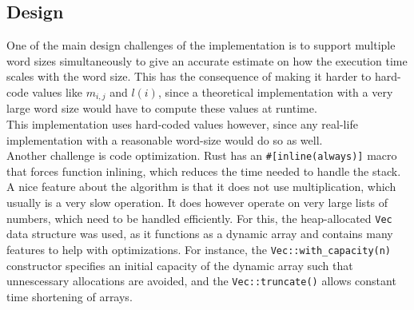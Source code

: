 \subsection{Design}
One of the main design challenges of the implementation is to support multiple word sizes simultaneously to give an accurate estimate on how the execution time scales with the word size. This has the consequence of making it harder to hard-code values like $m_{i, j}$ and $l(i)$, since a theoretical implementation with a very large word size would have to compute these values at runtime.\\
This implementation uses hard-coded values however, since any real-life implementation with a reasonable word-size would do so as well.\\
Another challenge is code optimization. Rust has an \texttt{\#[inline(always)]} macro that forces function inlining, which reduces the time needed to handle the stack.
A nice feature about the algorithm is that it does not use multiplication, which usually is a very slow operation. It does however operate on very large lists of numbers, which need to be handled efficiently. For this, the heap-allocated \texttt{Vec} data structure was used, as it functions as a dynamic array and contains many features to help with optimizations. For instance, the \texttt{Vec::with\_capacity(n)} constructor specifies an initial capacity of the dynamic array such that unnescessary allocations are avoided, and the \texttt{Vec::truncate()} allows constant time shortening of arrays\cite{rust-lang}.\\


